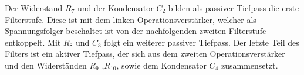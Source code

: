 \noindent
Der Widerstand $R_7$ und der Kondensator $C_2$ bilden als passiver Tiefpass die erste Filterstufe. Diese ist mit dem linken Operationsverstärker, welcher als Spannungsfolger beschaltet ist von der nachfolgenden zweiten Filterstufe entkoppelt. Mit $R_8$ und $C_3$ folgt ein weiterer passiver Tiefpass. Der letzte Teil des Filters ist ein aktiver Tiefpass, der sich aus dem zweiten Operationsverstärker und den Widerständen $R_9$ ,$R_{10}$, sowie dem Kondensator $C_4$ zusammensetzt.







